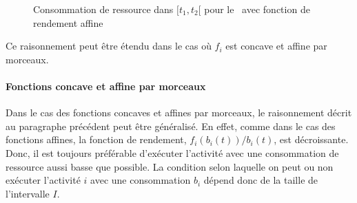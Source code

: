 \begin{ex}
\begin{figure}[!htb]
{
}
  \caption{Consommation de ressource dans $[t_1,t_2[$ pour le
    \CECSP~avec fonction de rendement affine}
\label{fig:ex_Lin}
\end{figure}
\end{ex}

Ce raisonnement peut être étendu dans le cas où $f_i$ est concave et
affine par morceaux. 

\paragraph{Fonctions concave et affine par morceaux}

Dans le cas des fonctions concaves et affines par morceaux, le
raisonnement décrit au paragraphe précédent peut être généralisé. En
effet, comme dans le cas des fonctions affines, la fonction de
rendement, $f_i(b_i(t))/b_i(t)$, est décroissante. Donc, il est
toujours préférable d'exécuter l'activité avec une consommation de
ressource aussi basse que possible. La condition selon laquelle on
peut ou non exécuter l'activité $i$ avec une consommation $b_i$ dépend
donc de la taille de l'intervalle $I$. 


